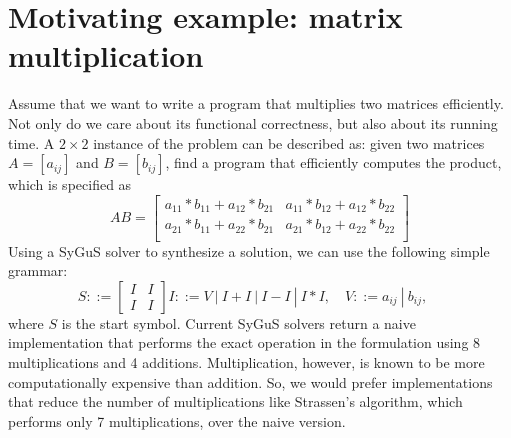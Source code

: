 \section{Motivating example: matrix multiplication}
\label{sec:example}

Assume that we want to write a program that multiplies two matrices efficiently. 
%
Not only do we care about its functional correctness, but also about its running time.
%
A $2 \times 2$ instance of the problem can be described as: given two matrices $A = [a_{ij}]$ and $B = [b_{ij}]$, find a program that efficiently computes the product, which is specified as
%
\begin{equation}
    AB =
\begin{bmatrix}
a_{11} * b_{11} + a_{12} * b_{21} &
a_{11} * b_{12} + a_{12} * b_{22} \\
a_{21} * b_{11} + a_{22} * b_{21} &
a_{21} * b_{12} + a_{22} * b_{22} \\
\end{bmatrix}
\label{eqn:matrix-mul}
\end{equation}
%
%
Using a SyGuS solver to synthesize a solution, we can use the following simple grammar:
%
\[
S ::=
\begin{bmatrix} I & I \\
I & I
\end{bmatrix}
I ::= V \ | \ I + I \ | \ I - I \ | \ I * I, \quad
V ::= a_{ij} \ | \ b_{ij}, \quad
\]
%
where $S$ is the start symbol.
%
Current SyGuS solvers return a naive implementation that performs the exact operation in the formulation using 8 multiplications and 4 additions.
%
Multiplication, however, is known to be more computationally expensive than addition.
%
So, we would prefer implementations that reduce the number of multiplications like Strassen's algorithm, which performs only 7 multiplications, over the naive version.
%
